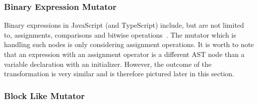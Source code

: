 \subsubsection{Binary Expression Mutator}

Binary expressions in JavaScript (and TypeScript) include, but are not limited to, assignments, comparisons and bitwise operations~\cite{expressions-and-operators:MDN:2017}. The mutator which is handling such nodes is only considering assignment operations. It is worth to note that an expression with an assignment operator is a different AST node than a variable declaration with an initializer. However, the outcome of the transformation is very similar and is therefore pictured later in this section.

\subsubsection{Block Like Mutator}

